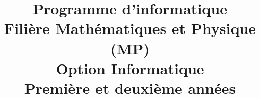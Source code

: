 \documentclass[a4paper]{article}
\begin{document}
\title{Programme d'informatique\\Filière Mathématiques et Physique (MP)\\Option Informatique\\Première et deuxième années}
\maketitle
\thispagestyle{fancy}
\clearpage

\tableofcontents
\clearpage



\clearpage


\clearpage


\clearpage
\appendix


\end{document}
